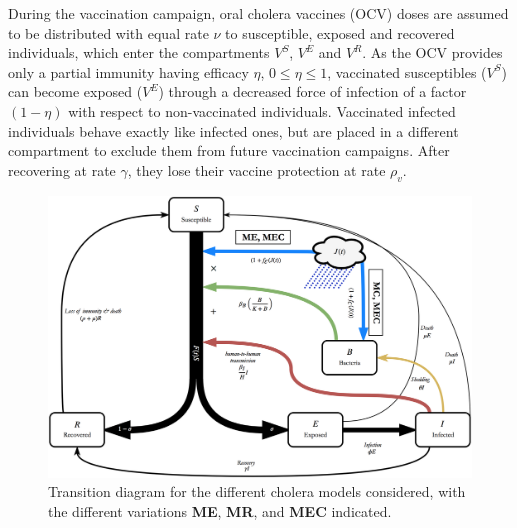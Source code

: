 During the vaccination campaign, oral cholera vaccines (OCV) doses are assumed to be distributed with equal rate $\nu$ to susceptible, exposed and recovered individuals, which enter the compartments $V^S$, $V^E$ and $V^R$. As the OCV provides only a partial immunity having efficacy $\eta$, $0\leq \eta \leq 1$, vaccinated susceptibles ($V^S$) can become exposed ($V^E$) through a decreased force of infection of a factor $(1-\eta)$ with respect to non-vaccinated individuals. Vaccinated infected individuals behave exactly like infected ones, but are placed in a different compartment to exclude them from future vaccination campaigns. After recovering at  rate $\gamma$, they lose their vaccine protection at rate $\rho_{v}$.
\begin{figure}
  \centering
  \includegraphics[width=\textwidth]{fig_cholera-rainfall/Lemaitre_ACTROP_2018_42_R1_fig1.png}
  \caption[Transition diagram for the competing cholera models]{Transition diagram for the different cholera models considered, with the different variations \textbf{ME}, \textbf{MR}, and \textbf{MEC} indicated.}
  \label{diagram}
\end{figure}

